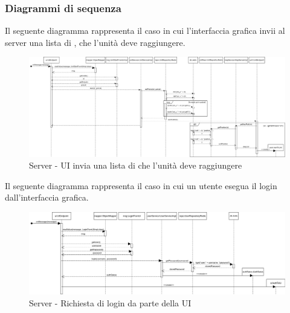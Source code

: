 		\newpage
	
		\begin{landscape}
			\subsubsection{Diagrammi di sequenza}
			Il seguente diagramma rappresenta il caso in cui l'interfaccia grafica invii al server una lista di , che l'unità deve raggiungere.\\
			\begin{figure}[H]
				\centering
				\includegraphics[width=25.7cm]{img/server_seq1.png}
				\caption{Server - UI invia una lista di  che l'unità deve raggiungere}
			\end{figure}
		\end{landscape}
		
		\newpage
		
		\begin{landscape}
			Il seguente diagramma rappresenta il caso in cui un utente esegua il login dall'interfaccia grafica.
			\begin{figure}[H]
				\centering
				\includegraphics[width=25.7cm]{img/server_seq2.png}
				\caption{Server - Richiesta di login da parte della UI}
			\end{figure}
		\end{landscape}

		\newpage

